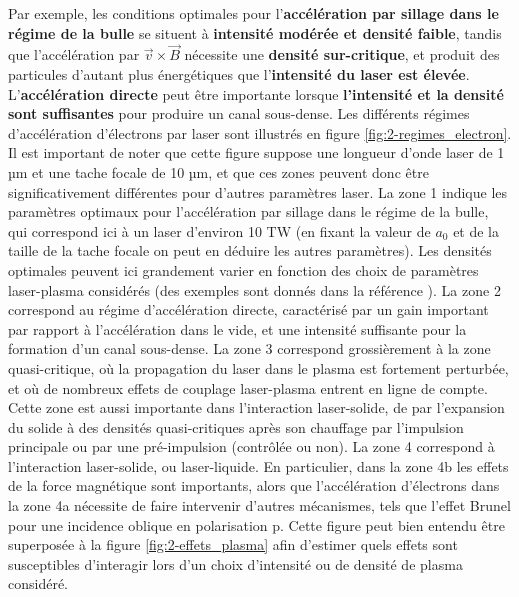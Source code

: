 \begin{refsection}
Par exemple, les conditions optimales pour l'\textbf{accélération par sillage dans le régime de la bulle} se situent à \textbf{intensité modérée et densité faible}, tandis que l'accélération par \textbf{$\vec{v} \times \vec{B}$} nécessite une \textbf{densité sur-critique}, et produit des particules d'autant plus énergétiques que l'\textbf{intensité du laser est élevée}. L'\textbf{accélération directe} peut être importante lorsque \textbf{l'intensité et la densité sont suffisantes} pour produire un canal sous-dense. Les différents régimes d'accélération d'électrons par laser sont illustrés en figure \ref{fig:2-regimes_electron}. Il est important de noter que cette figure suppose une longueur d'onde laser de 1 µm et une tache focale de 10 µm, et que ces zones peuvent donc être significativement différentes pour d'autres paramètres laser. La zone 1 indique les paramètres optimaux pour l'accélération par sillage dans le régime de la bulle, qui correspond ici à un laser d'environ 10 TW (en fixant la valeur de $a_0$ et de la taille de la tache focale on peut en déduire les autres paramètres). Les densités optimales peuvent ici grandement varier en fonction des choix de paramètres laser-plasma considérés (des exemples sont donnés dans la référence \parencite{faure_2019}). La zone 2 correspond au régime d'accélération directe, caractérisé par un gain important par rapport à l'accélération dans le vide, et une intensité suffisante pour la formation d'un canal sous-dense. La zone 3 correspond grossièrement à la zone quasi-critique, où la propagation du laser dans le plasma est fortement perturbée, et où de nombreux effets de couplage laser-plasma entrent en ligne de compte. Cette zone est aussi importante dans l'interaction laser-solide, de par l'expansion du solide à des densités quasi-critiques après son chauffage par l'impulsion principale ou par une pré-impulsion (contrôlée ou non). La zone 4 correspond à l'interaction laser-solide, ou laser-liquide. En particulier, dans la zone 4b les effets de la force magnétique sont importants, alors que l'accélération d'électrons dans la zone 4a nécessite de faire intervenir d'autres mécanismes, tels que l'effet Brunel pour une incidence oblique en polarisation p. Cette figure peut bien entendu être superposée à la figure \ref{fig:2-effets_plasma} afin d'estimer quels effets sont susceptibles d'interagir lors d'un choix d'intensité ou de densité de plasma considéré. 


\end{refsection}
